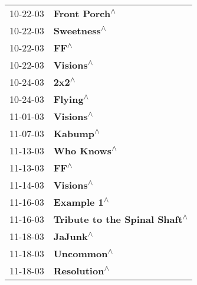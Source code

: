 \begin{supertabular}{p{0.25\columnwidth}p{0.75\columnwidth}}
 10-22-03 &                                                              \textbf{Front Porch\textsuperscript{$\wedge$}} \\
 10-22-03 &                                                                \textbf{Sweetness\textsuperscript{$\wedge$}} \\
 10-22-03 &                                                                       \textbf{FF\textsuperscript{$\wedge$}} \\
 10-22-03 &                                                                  \textbf{Visions\textsuperscript{$\wedge$}} \\
 10-24-03 &                                                                      \textbf{2x2\textsuperscript{$\wedge$}} \\
 10-24-03 &                                                                   \textbf{Flying\textsuperscript{$\wedge$}} \\
 11-01-03 &                                                                  \textbf{Visions\textsuperscript{$\wedge$}} \\
 11-07-03 &                                                                   \textbf{Kabump\textsuperscript{$\wedge$}} \\
 11-13-03 &                                                                \textbf{Who Knows\textsuperscript{$\wedge$}} \\
 11-13-03 &                                                                       \textbf{FF\textsuperscript{$\wedge$}} \\
 11-14-03 &                                                                  \textbf{Visions\textsuperscript{$\wedge$}} \\
 11-16-03 &                                                                \textbf{Example 1\textsuperscript{$\wedge$}} \\
 11-16-03 &                                              \textbf{Tribute to the Spinal Shaft\textsuperscript{$\wedge$}} \\
 11-18-03 &                                                                   \textbf{JaJunk\textsuperscript{$\wedge$}} \\
 11-18-03 &                                                                 \textbf{Uncommon\textsuperscript{$\wedge$}} \\
 11-18-03 &                                                               \textbf{Resolution\textsuperscript{$\wedge$}} \\

\end{supertabular}
